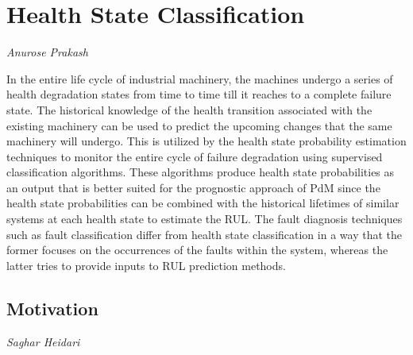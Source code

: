 %
\chapter{Health State Classification}
\label{sec:system}

\newline 
\vspace*{-15mm}
\hfill{\normalsize\emph{Anurose Prakash}}\newline 
\newline 

In the entire life cycle of industrial machinery, the machines undergo a series of health degradation states from time to time till it reaches to a complete failure state. The historical knowledge of the health transition associated with the existing machinery can be used to predict the upcoming changes that the same machinery will undergo. This is utilized by the health state probability estimation techniques to monitor the entire cycle of failure degradation using supervised classification algorithms. These algorithms produce health state probabilities as an output that is better suited for the prognostic approach of PdM since the health state probabilities can be combined with the historical lifetimes of similar systems at each health state to estimate the RUL. The fault diagnosis techniques such as fault classification differ from health state classification in a way that the former focuses on the occurrences of the faults within the system, whereas the latter tries to provide inputs to RUL prediction methods.\newline 

\section{Motivation}
\vspace*{-15mm}
\hfill{\normalsize\emph{Saghar Heidari}}
\label{sec:system:sec1}

